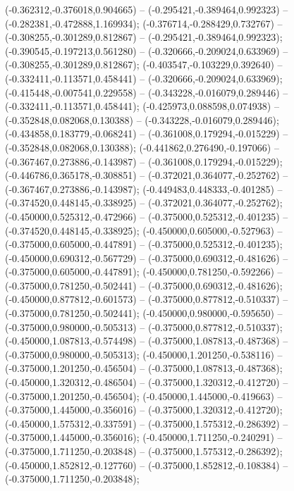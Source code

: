  (-0.362312,-0.376018,0.904665) -- (-0.295421,-0.389464,0.992323) -- (-0.282381,-0.472888,1.169934);
 (-0.376714,-0.288429,0.732767) -- (-0.308255,-0.301289,0.812867) -- (-0.295421,-0.389464,0.992323);
 (-0.390545,-0.197213,0.561280) -- (-0.320666,-0.209024,0.633969) -- (-0.308255,-0.301289,0.812867);
 (-0.403547,-0.103229,0.392640) -- (-0.332411,-0.113571,0.458441) -- (-0.320666,-0.209024,0.633969);
 (-0.415448,-0.007541,0.229558) -- (-0.343228,-0.016079,0.289446) -- (-0.332411,-0.113571,0.458441);
 (-0.425973,0.088598,0.074938) -- (-0.352848,0.082068,0.130388) -- (-0.343228,-0.016079,0.289446);
 (-0.434858,0.183779,-0.068241) -- (-0.361008,0.179294,-0.015229) -- (-0.352848,0.082068,0.130388);
 (-0.441862,0.276490,-0.197066) -- (-0.367467,0.273886,-0.143987) -- (-0.361008,0.179294,-0.015229);
 (-0.446786,0.365178,-0.308851) -- (-0.372021,0.364077,-0.252762) -- (-0.367467,0.273886,-0.143987);
 (-0.449483,0.448333,-0.401285) -- (-0.374520,0.448145,-0.338925) -- (-0.372021,0.364077,-0.252762);
 (-0.450000,0.525312,-0.472966) -- (-0.375000,0.525312,-0.401235) -- (-0.374520,0.448145,-0.338925);
 (-0.450000,0.605000,-0.527963) -- (-0.375000,0.605000,-0.447891) -- (-0.375000,0.525312,-0.401235);
 (-0.450000,0.690312,-0.567729) -- (-0.375000,0.690312,-0.481626) -- (-0.375000,0.605000,-0.447891);
 (-0.450000,0.781250,-0.592266) -- (-0.375000,0.781250,-0.502441) -- (-0.375000,0.690312,-0.481626);
 (-0.450000,0.877812,-0.601573) -- (-0.375000,0.877812,-0.510337) -- (-0.375000,0.781250,-0.502441);
 (-0.450000,0.980000,-0.595650) -- (-0.375000,0.980000,-0.505313) -- (-0.375000,0.877812,-0.510337);
 (-0.450000,1.087813,-0.574498) -- (-0.375000,1.087813,-0.487368) -- (-0.375000,0.980000,-0.505313);
 (-0.450000,1.201250,-0.538116) -- (-0.375000,1.201250,-0.456504) -- (-0.375000,1.087813,-0.487368);
 (-0.450000,1.320312,-0.486504) -- (-0.375000,1.320312,-0.412720) -- (-0.375000,1.201250,-0.456504);
 (-0.450000,1.445000,-0.419663) -- (-0.375000,1.445000,-0.356016) -- (-0.375000,1.320312,-0.412720);
 (-0.450000,1.575312,-0.337591) -- (-0.375000,1.575312,-0.286392) -- (-0.375000,1.445000,-0.356016);
 (-0.450000,1.711250,-0.240291) -- (-0.375000,1.711250,-0.203848) -- (-0.375000,1.575312,-0.286392);
 (-0.450000,1.852812,-0.127760) -- (-0.375000,1.852812,-0.108384) -- (-0.375000,1.711250,-0.203848);
